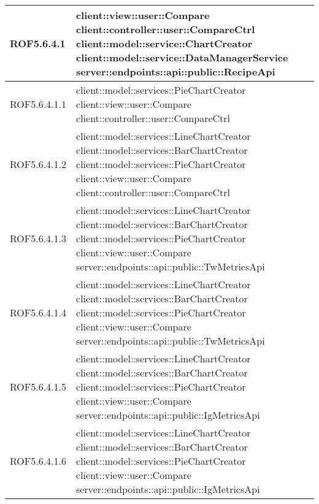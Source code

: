\begin{center}
\begin{longtable}{| p{2.5cm} | p{11cm} |}
\hline
ROF5.6.4.1 & client::view::user::Compare \newline client::controller::user::CompareCtrl \newline client::model::service::ChartCreator \newline client::model::service::DataManagerService \newline server::endpoints::api::public::RecipeApi \\
\hline
ROF5.6.4.1.1 & client::model::services::PieChartCreator \newline client::view::user::Compare \newline client::controller::user::CompareCtrl \\
\hline
ROF5.6.4.1.2 & client::model::services::LineChartCreator \newline client::model::services::BarChartCreator \newline client::model::services::PieChartCreator \newline client::view::user::Compare \newline client::controller::user::CompareCtrl \\
\hline
ROF5.6.4.1.3 & client::model::services::LineChartCreator \newline client::model::services::BarChartCreator \newline client::model::services::PieChartCreator \newline client::view::user::Compare \newline server::endpoints::api::public::TwMetricsApi \\
\hline
ROF5.6.4.1.4 & client::model::services::LineChartCreator \newline client::model::services::BarChartCreator \newline client::model::services::PieChartCreator \newline client::view::user::Compare \newline server::endpoints::api::public::TwMetricsApi \\
\hline
ROF5.6.4.1.5 & client::model::services::LineChartCreator \newline client::model::services::BarChartCreator \newline client::model::services::PieChartCreator \newline client::view::user::Compare \newline server::endpoints::api::public::IgMetricsApi \\
\hline
ROF5.6.4.1.6 & client::model::services::LineChartCreator \newline client::model::services::BarChartCreator \newline client::model::services::PieChartCreator \newline client::view::user::Compare \newline server::endpoints::api::public::IgMetricsApi \\

\end{longtable}
\end{center}
